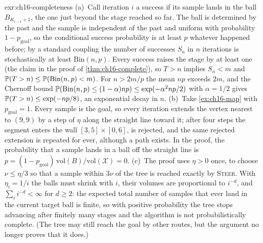 \begin{solution}{exr:ch16-completeness}
(a)~Call iteration $i$ a success if its sample lands in the ball $B_{K_{i-1}+1}$, the one just beyond the stage reached so far. The ball is determined by the past and the sample is independent of the past and uniform with probability $1-p_{\mathrm{goal}}$, so the conditional success probability is at least $p$ whatever happened before; by a standard coupling the number of successes $S_n$ in $n$ iterations is stochastically at least $\mathrm{Bin}(n,p)$. Every success raises the stage by at least one (the claim in the proof of \cref{thm:ch16-complete}), so $T>n$ implies $S_n<m$ and $\mathbb{P}(T>n)\le\mathbb{P}(\mathrm{Bin}(n,p)<m)$. For $n>2m/p$ the mean $np$ exceeds $2m$, and the Chernoff bound $\mathbb{P}(\mathrm{Bin}(n,p)\le(1-\alpha)np)\le\exp(-\alpha^{2}np/2)$ with $\alpha=1/2$ gives $\mathbb{P}(T>n)\le\exp(-np/8)$, an exponential decay in $n$. (b)~Take \cref{ex:ch16-map} with $p_{\mathrm{goal}}=1$. Every sample is the goal, so every iteration extends the vertex nearest to $(9,9)$ by a step of $\eta$ along the straight line toward it; after four steps the segment enters the wall $[3,5]\times[0,6]$, is rejected, and the same rejected extension is repeated for ever, although a path exists. In the proof, the probability that a sample lands in a ball off the straight line is $p=(1-p_{\mathrm{goal}})\,\mathrm{vol}(B)/\mathrm{vol}(\mathcal{X})=0$. (c)~The proof uses $\eta>0$ once, to choose $\nu\le\eta/3$ so that a sample within $3\nu$ of the tree is reached exactly by \textsc{Steer}. With $\eta_i=1/i$ the balls must shrink with $i$, their volumes are proportional to $i^{-d}$, and $\sum_i i^{-d}<\infty$ for $d\ge2$: the expected total number of samples that ever land in the current target ball is finite, so with positive probability the tree stops advancing after finitely many stages and the algorithm is not probabilistically complete. (The tree may still reach the goal by other routes, but the argument no longer proves that it does.)
\end{solution}

